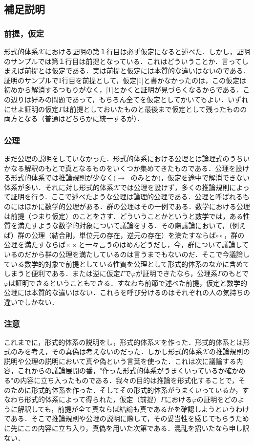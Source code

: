 \documentclass[10pt,b5paper,papersize,dvipdfmx]{jsbook}
\begin{document}
\subsection{補足説明}
\subsubsection{前提，仮定}
形式的体系$\mathcal K$における証明の第１行目は必ず仮定になると述べた．しかし，証明のサンプルでは第１行目は前提となっている．これはどういうことか．言ってしまえば前提とは仮定である．実は前提と仮定には本質的な違いはないのである．証明のサンプルで1行目を前提として，仮定[1]と書かなかったのは，この仮定は初めから解消するつもりがなく，[1]とかくと証明が見づらくなるからである．この辺りは好みの問題であって，もちろん全てを仮定としてかいてもよい．いずれにせよ証明の仮定$\Gamma$は前提としておいたものと最後まで仮定として残ったものの両方となる（普通はどちらかに統一するが）．

\subsubsection{公理}
まだ公理の説明をしていなかった．形式的体系における公理とは論理式のうちいかなる解釈のもとで真となるものをいくつか集めてきたものである．公理を設ける形式的体系では推論規則が少なく($\to_-$のみとか)，仮定を途中で解消できない体系が多い．それに対し形式的体系$\mathcal K$では公理を設けず，多くの推論規則によって証明を行う．ここで述べたような公理は論理的公理である．公理と呼ばれるものにはほかに数学的公理がある．群の公理はその一例である．数学における公理は前提（つまり仮定）のことをさす．どういうことかというと数学では，ある性質を満たすような数学的対象について議論をする．その際議論において，（例えば）群の公理（結合則，単位元の存在，逆元の存在）を満たすならば$\circ \circ$，群の公理を満たすならば$\times \times$と一々言うのはめんどうだし，今，群について議論しているのだから群の公理を満たしているのは言うまでもないのだ．そこで今議論している数学的対象で前提としている性質を公理として形式的体系のなかに含めてしまうと便利である．または逆に仮定$\Gamma$で$\varphi$が証明できたなら，公理系$\Gamma$のもとで$\varphi$は証明できるということもできる．すなわち前節で述べた前提，仮定と数学的公理には本質的な違いはない．これらを呼び分けるのはそれぞれの人の気持ちの違いでしかない．

\subsubsection{注意}
これまでに，形式的体系の説明をし，形式的体系$\mathcal K$を作った．形式的体系とは形式のみを考え，その真偽は考えないのだった．しかし$形式的体系\mathcal K$の推論規則の説明や公理の説明において真や偽という言葉を使った．これは次に議論する内容，これからの議論展開の番，"作った形式的体系がうまくいっているか確かめる"の内容に立ち入ったものである．我々の目的は推論を形式化することで，そのために形式的体系を作った．そしてその形式的体系がうまくいっているか，すなわち形式的体系によって得られた，仮定（前提）$\Gamma$における$\varphi$の証明をどのように解釈しても，前提が全て真ならば結論も真であるかを確認しようというわけである．そこで推論規則や公理の説明に際して，その妥当性を感じてもらうために先にこの内容に立ち入り，真偽を用いた次第である．混乱を招いたなら申し訳ない．
\end{document}
